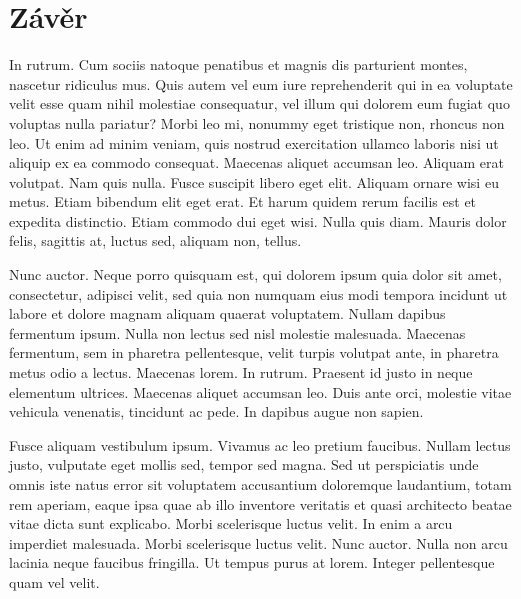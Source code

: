 \chapter{Závěr}





In rutrum. Cum sociis natoque penatibus et magnis dis parturient montes, nascetur ridiculus mus. Quis autem vel eum iure reprehenderit qui in ea voluptate velit esse quam nihil molestiae consequatur, vel illum qui dolorem eum fugiat quo voluptas nulla pariatur? Morbi leo mi, nonummy eget tristique non, rhoncus non leo. Ut enim ad minim veniam, quis nostrud exercitation ullamco laboris nisi ut aliquip ex ea commodo consequat. Maecenas aliquet accumsan leo. Aliquam erat volutpat. Nam quis nulla. Fusce suscipit libero eget elit. Aliquam ornare wisi eu metus. Etiam bibendum elit eget erat. Et harum quidem rerum facilis est et expedita distinctio. Etiam commodo dui eget wisi. Nulla quis diam. Mauris dolor felis, sagittis at, luctus sed, aliquam non, tellus.

Nunc auctor. Neque porro quisquam est, qui dolorem ipsum quia dolor sit amet, consectetur, adipisci velit, sed quia non numquam eius modi tempora incidunt ut labore et dolore magnam aliquam quaerat voluptatem. Nullam dapibus fermentum ipsum. Nulla non lectus sed nisl molestie malesuada. Maecenas fermentum, sem in pharetra pellentesque, velit turpis volutpat ante, in pharetra metus odio a lectus. Maecenas lorem. In rutrum. Praesent id justo in neque elementum ultrices. Maecenas aliquet accumsan leo. Duis ante orci, molestie vitae vehicula venenatis, tincidunt ac pede. In dapibus augue non sapien.

Fusce aliquam vestibulum ipsum. Vivamus ac leo pretium faucibus. Nullam lectus justo, vulputate eget mollis sed, tempor sed magna. Sed ut perspiciatis unde omnis iste natus error sit voluptatem accusantium doloremque laudantium, totam rem aperiam, eaque ipsa quae ab illo inventore veritatis et quasi architecto beatae vitae dicta sunt explicabo. Morbi scelerisque luctus velit. In enim a arcu imperdiet malesuada. Morbi scelerisque luctus velit. Nunc auctor. Nulla non arcu lacinia neque faucibus fringilla. Ut tempus purus at lorem. Integer pellentesque quam vel velit.


